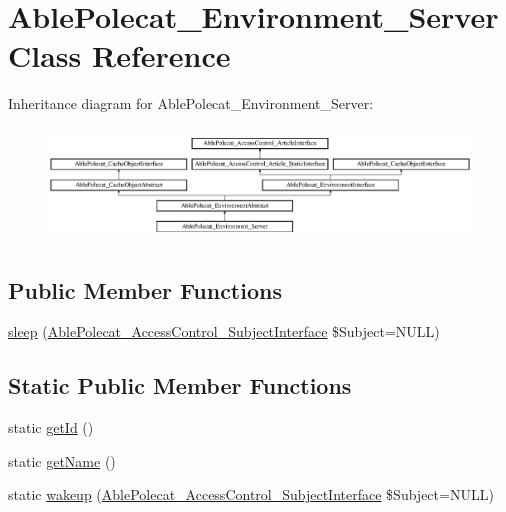 \hypertarget{class_able_polecat___environment___server}{}\section{Able\+Polecat\+\_\+\+Environment\+\_\+\+Server Class Reference}
\label{class_able_polecat___environment___server}
Inheritance diagram for Able\+Polecat\+\_\+\+Environment\+\_\+\+Server\+:\begin{figure}[H]
\begin{center}
\leavevmode
\includegraphics[height=3.010753cm]{class_able_polecat___environment___server}
\end{center}
\end{figure}
\subsection*{Public Member Functions}
\begin{DoxyCompactItemize}
\item 
\hyperlink{class_able_polecat___environment___server_a365e24d7b066205cafa2a5cce3a4f224}{sleep} (\hyperlink{interface_able_polecat___access_control___subject_interface}{Able\+Polecat\+\_\+\+Access\+Control\+\_\+\+Subject\+Interface} \$Subject=N\+U\+L\+L)
\end{DoxyCompactItemize}
\subsection*{Static Public Member Functions}
\begin{DoxyCompactItemize}
\item 
static \hyperlink{class_able_polecat___environment___server_acfaa3a96d0cb5a4c0d4d710dcba41e9e}{get\+Id} ()
\item 
static \hyperlink{class_able_polecat___environment___server_a4ef9bd37ba3ce8a13c1e8bcf4f72a630}{get\+Name} ()
\item 
static \hyperlink{class_able_polecat___environment___server_a3f2135f6ad45f51d075657f6d20db2cd}{wakeup} (\hyperlink{interface_able_polecat___access_control___subject_interface}{Able\+Polecat\+\_\+\+Access\+Control\+\_\+\+Subject\+Interface} \$Subject=N\+U\+L\+L)
\end{DoxyCompactItemize}
